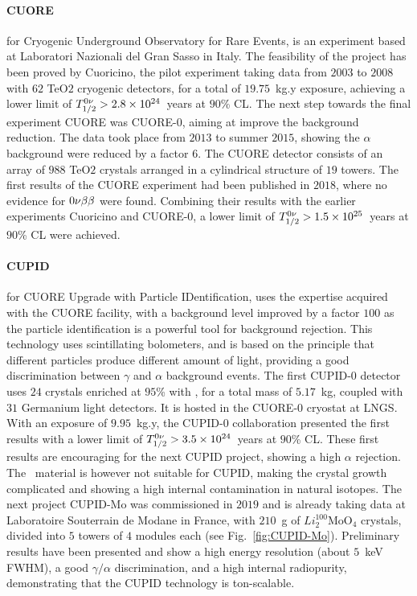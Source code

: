 \paragraph{CUORE} for Cryogenic Underground Observatory for Rare Events, is an experiment based at Laboratori Nazionali del Gran Sasso in Italy.
The feasibility of the project has been proved by Cuoricino, the pilot experiment taking data from $2003$ to $2008$ with $62$ TeO$2$ cryogenic detectors, for a total of $19.75$~kg.y exposure, achieving a lower limit of $T_{1/2}^{0\nu}>2.8\times 10^{24}$~years at $90$\% CL.
The next step towards the final experiment CUORE was CUORE-$0$, aiming at improve the background reduction.
The data took place from $2013$ to summer $2015$, showing the $\alpha$ background were reduced by a factor $6$.
The CUORE detector consists of an array of $988$ TeO$2$ crystals arranged in a cylindrical structure of $19$ towers.
The first results of the CUORE experiment had been published in $2018$, where no evidence for $0\nu\beta\beta$ were found.
Combining their results with the earlier experiments Cuoricino and CUORE-$0$, a lower limit of $T_{1/2}^{0\nu}>1.5\times 10^{25}$~years at $90$\% CL were achieved.



\paragraph{CUPID} for CUORE Upgrade with Particle IDentification, uses the expertise acquired with the CUORE facility, with a background level improved by a factor $100$ as the particle identification is a powerful tool for background rejection.
This technology uses scintillating bolometers, and is based on the principle that different particles produce different amount of light, providing a good discrimination between $\gamma$ and $\alpha$ background events.
The first CUPID-$0$ detector uses $24$ crystals enriched at $95$\% with \Se, for a total mass of $5.17$~kg, coupled with $31$ Germanium light detectors.
It is hosted in the CUORE-$0$ cryostat at LNGS.
With an exposure of $9.95$~kg.y, the CUPID-$0$ collaboration presented the first results with a lower limit of $T_{1/2}^{0\nu}>3.5\times 10^{24}$~years at $90$\% CL.
These first results are encouraging for the next CUPID project, showing a high $\alpha$ rejection.
The \Se\ material is however not suitable for CUPID, making the crystal growth complicated and showing a high internal contamination in natural isotopes.
The next project CUPID-Mo was commissioned in $2019$ and is already taking data at Laboratoire Souterrain de Modane in France, with $210$~g of $Li_2^{100}$MoO$_4$ crystals, divided into $5$ towers of $4$ modules each (see Fig.~\ref{fig:CUPID-Mo}).
Preliminary results have been presented and show a high energy resolution (about $5$~keV FWHM), a good $\gamma/\alpha$ discrimination, and a high internal radiopurity, demonstrating that the CUPID technology is ton-scalable.

